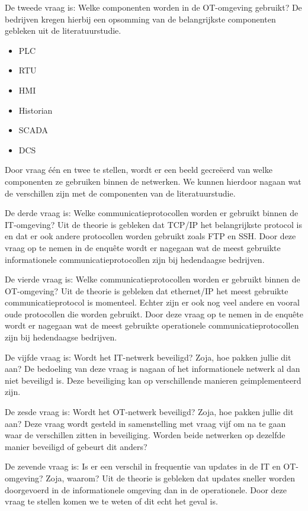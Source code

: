 De tweede vraag is: Welke componenten worden in de OT-omgeving gebruikt? De bedrijven kregen hierbij een opsomming van de belangrijkste componenten gebleken uit de literatuurstudie.
\begin{itemize}
    \item PLC
    \item RTU
    \item HMI
    \item Historian
    \item SCADA
    \item DCS
\end{itemize}
Door vraag één en twee te stellen, wordt er een beeld gecreëerd van welke componenten ze gebruiken binnen de netwerken. We kunnen hierdoor nagaan wat de verschillen zijn met de componenten van de literatuurstudie.


De derde vraag is: Welke communicatieprotocollen worden er gebruikt binnen de IT-omgeving? Uit de theorie is gebleken dat TCP/IP het belangrijkste protocol is en dat er ook andere protocollen worden gebruikt zoals FTP en SSH. Door deze vraag op te nemen in de enquête wordt er nagegaan wat de meest gebruikte informationele communicatieprotocollen zijn bij hedendaagse bedrijven. 
 
De vierde vraag is: Welke communicatieprotocollen worden er gebruikt binnen de OT-omgeving? Uit de theorie is gebleken dat ethernet/IP het meest gebruikte communicatieprotocol is momenteel. Echter zijn er ook nog veel andere en vooral oude protocollen die worden gebruikt. Door deze vraag op te nemen in de enquête wordt er nagegaan wat de meest gebruikte operationele communicatieprotocollen zijn bij hedendaagse bedrijven.

De vijfde vraag is: Wordt het IT-netwerk beveiligd? Zoja, hoe pakken jullie dit aan? De bedoeling van deze vraag is nagaan of het informationele netwerk al dan niet beveiligd is. Deze beveiliging kan op verschillende manieren geimplementeerd zijn. 

De zesde vraag is: Wordt het OT-netwerk beveiligd? Zoja, hoe pakken jullie dit aan? Deze vraag wordt gesteld in samenstelling met vraag vijf om na te gaan waar de verschillen zitten in beveiliging. Worden beide netwerken op dezelfde manier beveiligd of gebeurt dit anders? 

De zevende vraag is: Is er een verschil in frequentie van updates in de IT en OT-omgeving? Zoja, waarom? Uit de theorie is gebleken dat updates sneller worden doorgevoerd in de informationele omgeving dan in de operationele. Door deze vraag te stellen komen we te weten of dit echt het geval is.

